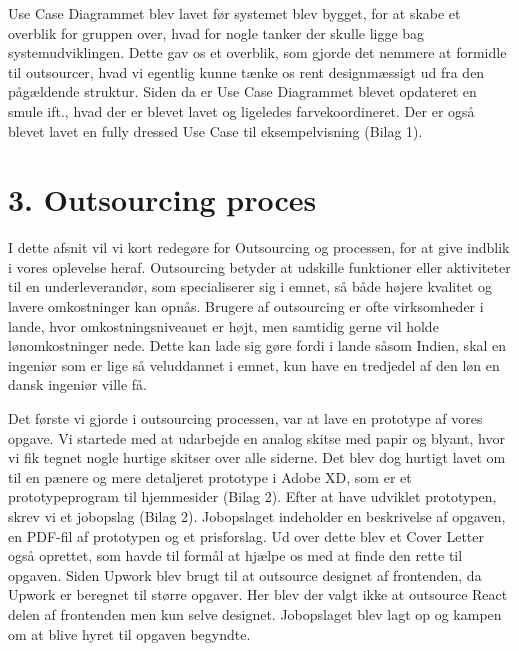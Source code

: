 \documentclass[11pt]{report}
\begin{document}
Use Case Diagrammet blev lavet før systemet blev bygget, for at skabe et overblik for gruppen over, hvad for nogle tanker der skulle ligge bag systemudviklingen. Dette gav os et overblik, som gjorde det nemmere at formidle til outsourcer, hvad vi egentlig kunne tænke os rent designmæssigt ud fra den pågældende struktur. Siden da er Use Case Diagrammet blevet opdateret en smule ift., hvad der er blevet lavet og ligeledes farvekoordineret. Der er også blevet lavet en fully dressed Use Case til eksempelvisning (Bilag 1).

\chapter*{3. Outsourcing proces}
I dette afsnit vil vi kort redegøre for Outsourcing og processen, for at give indblik i vores oplevelse heraf. Outsourcing betyder at udskille funktioner eller aktiviteter til en underleverandør, som specialiserer sig i emnet, så både højere kvalitet og lavere omkostninger kan opnås. Brugere af outsourcing er ofte virksomheder i lande, hvor omkostningsniveauet er højt, men samtidig gerne vil holde lønomkostninger nede. Dette kan lade sig gøre fordi i lande såsom Indien, skal en ingeniør som er lige så veluddannet i emnet, kun have en tredjedel af den løn en dansk ingeniør ville få.

Det første vi gjorde i outsourcing processen, var at lave en prototype af vores opgave. Vi startede med at udarbejde en analog skitse med papir og blyant, hvor  vi fik tegnet nogle hurtige skitser over alle siderne. Det blev dog hurtigt lavet om til en pænere og mere detaljeret prototype i Adobe XD, som er et prototypeprogram til hjemmesider (Bilag 2). Efter at have udviklet prototypen, skrev vi et jobopslag (Bilag 2). Jobopslaget indeholder en beskrivelse af opgaven, en PDF-fil af prototypen og et prisforslag. Ud over dette blev et Cover Letter også oprettet, som havde til formål at  hjælpe os med at finde den rette til opgaven. Siden Upwork blev brugt til at outsource designet af frontenden, da Upwork er beregnet til større opgaver. Her blev der valgt ikke at outsource React delen af frontenden men kun selve designet. Jobopslaget blev lagt op og kampen om at blive hyret til opgaven begyndte.
\end{document}
